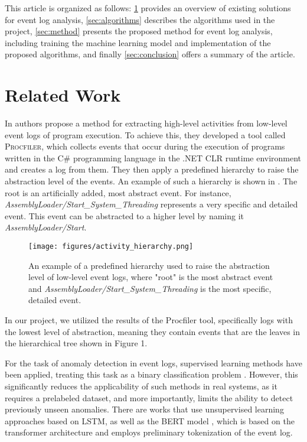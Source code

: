 \documentclass[sigplan,nonacm]{acmart}
\begin{document}
This article is organized as follows: 
\cref{sec:related}  provides an overview of existing solutions for event log analysis, 
\cref{sec:algorithms} describes the algorithms used in the project, 
\cref{sec:method} presents the proposed method for event log analysis, including training the machine learning model and implementation of the proposed algorithms, and finally
\cref{sec:conclusion} offers a summary of the article.

\section{Related Work}\label{sec:related}

In \cite{stepanov2024extracting} authors propose a method for extracting high-level activities from low-level event logs of program execution. To achieve this, they developed a tool called \textsc{Procfiler}, which collects events that occur during the execution of programs written in the C\# programming language in the .NET CLR runtime environment and creates a log from them. They then apply a predefined hierarchy to raise the abstraction level of the events. An example of such a hierarchy is shown in . The root is an artificially added, most abstract event. For instance, \textit{AssemblyLoader/Start\_System\_Threading} represents a very specific and detailed event. This event can be abstracted to a higher level by naming it \textit{AssemblyLoader/Start}.

\begin{figure}
  \centering
  \texttt{[image: figures/activity\_hierarchy.png]}
  \caption{An example of a predefined hierarchy used to raise the abstraction level of low-level event logs, where "root" is the most abstract event and \textit{AssemblyLoader/Start\_System\_Threading} is the most specific, detailed event.}
  \Description{}
  \label{fig:hierarchy}
\end{figure}

In our project, we utilized the results of the Procfiler tool, specifically logs with the lowest level of abstraction, meaning they contain events that are the leaves in the hierarchical tree shown in Figure 1.

For the task of anomaly detection in event logs, supervised learning methods have been applied, treating this task as a binary classification problem \cite{huang2020hitanomaly}. However, this significantly reduces the applicability of such methods in real systems, as it requires a prelabeled dataset, and more importantly, limits the ability to detect previously unseen anomalies. There are works that use unsupervised learning approaches \cite{du2017deeplog} based on LSTM, as well as the \textsc{BERT} model \cite{lee2023lanobert}, which is based on the transformer architecture and employs preliminary tokenization of the event log.
\end{document}
